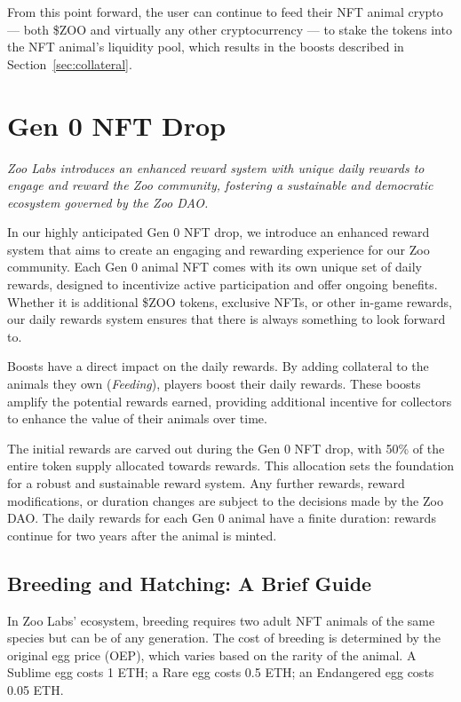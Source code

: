 From this point forward, the user can continue to feed their NFT animal crypto --- both \$ZOO and virtually any other cryptocurrency --- to stake the tokens into the NFT animal's liquidity pool, which results in the boosts described in Section~\ref{sec:collateral}.

\section{Gen 0 NFT Drop}
\label{sec:gen0}

\textit{Zoo Labs introduces an enhanced reward system with unique daily rewards to engage and reward the Zoo community, fostering a sustainable and democratic ecosystem governed by the Zoo DAO.}

In our highly anticipated Gen 0 NFT drop, we introduce an enhanced reward system that aims to create an engaging and rewarding experience for our Zoo community. Each Gen 0 animal NFT comes with its own unique set of daily rewards, designed to incentivize active participation and offer ongoing benefits. Whether it is additional \$ZOO tokens, exclusive NFTs, or other in-game rewards, our daily rewards system ensures that there is always something to look forward to.

Boosts have a direct impact on the daily rewards. By adding collateral to the animals they own (\emph{Feeding}), players boost their daily rewards. These boosts amplify the potential rewards earned, providing additional incentive for collectors to enhance the value of their animals over time.

The initial rewards are carved out during the Gen 0 NFT drop, with 50\% of the entire token supply allocated towards rewards. This allocation sets the foundation for a robust and sustainable reward system. Any further rewards, reward modifications, or duration changes are subject to the decisions made by the Zoo DAO. The daily rewards for each Gen 0 animal have a finite duration: rewards continue for two years after the animal is minted.

\subsection{Breeding and Hatching: A Brief Guide}

In Zoo Labs' ecosystem, breeding requires two adult NFT animals of the same species but can be of any generation. The cost of breeding is determined by the original egg price (OEP), which varies based on the rarity of the animal. A Sublime egg costs 1 ETH; a Rare egg costs 0.5 ETH; an Endangered egg costs 0.05 ETH.


